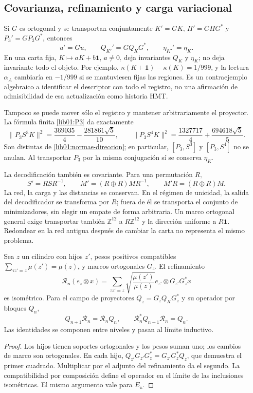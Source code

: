 \subsection{Covarianza, refinamiento y carga variacional}
\label{lib01:covarianza}

Si \(G\) es ortogonal y se transportan conjuntamente
\(K'=GK\), \(\Pi'=G\Pi G^*\) y \(P_3'=GP_3G^*\), entonces
\[
 u'=Gu,\qquad Q_{K'}'=GQ_KG^*,\qquad \eta_{K'}'=\eta_K.
\]
En una carta fija, \(K\mapsto aK+b\mathbf1\), \(a\ne0\), deja
invariantes \(Q_K\) y \(\eta_K\); no deja invariante todo el objeto.
Por ejemplo, \(\kappa(K+\mathbf1)-\kappa(K)=1/999\), y la lectura
\(\alpha_A\) cambiaría en \(-1/999\) si se mantuviesen fijas las
regiones. Es un contraejemplo algebraico a identificar el descriptor con
todo el registro, no una afirmación de admisibilidad de esa actualización
como historia HMT.

Tampoco se puede mover sólo el registro y mantener arbitrariamente el
proyector. La fórmula finita \eqref{lib01:P3} da exactamente
\[
 \|P_3S^3K\|^2=\frac{369035}{4}-\frac{281861\sqrt5}{10},
 \qquad
 \|P_3S^4K\|^2=\frac{1327717}{4}+\frac{694618\sqrt5}{5}.
\]
Son distintas de \eqref{lib01:normas-direccion}; en particular,
\([P_3,S^3]\) y \([P_3,S^4]\) no se anulan. Al transportar
\(P_3\) por la misma conjugación sí se conserva \(\eta_K\).

La decodificación también es covariante. Para una permutación \(R\),
\[
 S'=RSR^{-1},\qquad M'=(R\oplus R)MR^{-1},\qquad
 M'R=(R\oplus R)M.
\]
La red, la carga y las distancias se conservan. En el régimen de unicidad,
la salida del decodificador se transforma por \(R\); fuera de él se
transporta el conjunto de minimizadores, sin elegir un empate de forma
arbitraria. Un marco ortogonal general exige transportar también
\(\mathbb Z^{12}\) a \(R\mathbb Z^{12}\) y la dirección uniforme
a \(R\mathbf1\). Redondear en la red antigua después de cambiar la
carta no representa el mismo problema.

\begin{proposition}
\label{lib01:refinamiento}
Sea \(z\) un cilindro con hijos \(z'\), pesos positivos compatibles
\(\sum_{\tau z'=z}\mu(z')=\mu(z)\), y marcos ortogonales \(G_z\).
El refinamiento
\[
 \mathcal R_n(e_z\otimes x)=
 \sum_{\tau z'=z}\sqrt{\frac{\mu(z')}{\mu(z)}}
 e_{z'}\otimes G_{z'}G_z^*x
\]
es isométrico. Para el campo de proyectores
\(Q_z=G_zQ_KG_z^*\) y su operador por bloques \(Q_n\),
\[
 Q_{n+1}\mathcal R_n=\mathcal R_nQ_n,
 \qquad \mathcal R_n^*Q_{n+1}\mathcal R_n=Q_n.
\]
Las identidades se componen entre niveles y pasan al límite inductivo.
\end{proposition}
\begin{proof}
Los hijos tienen soportes ortogonales y los pesos suman uno; los cambios
de marco son ortogonales. En cada hijo,
\(Q_{z'}G_{z'}G_z^*=G_{z'}G_z^*Q_z\), que demuestra el primer
cuadrado. Multiplicar por el adjunto del refinamiento da el segundo.
La compatibilidad por composición define el operador en el límite de
las inclusiones isométricas. El mismo argumento vale para \(E_u\).
\end{proof}

